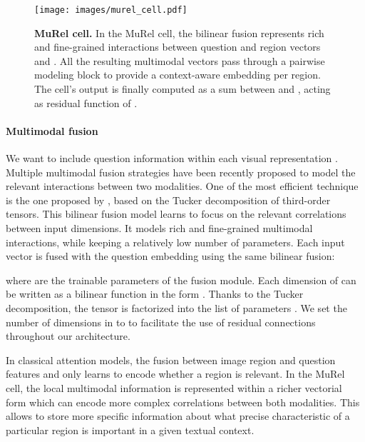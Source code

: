 \documentclass[10pt,twocolumn,letterpaper]{article}
\begin{document}
\begin{figure}
    \centering
    \texttt{[image: images/murel\_cell.pdf]}
    \caption{\label{fig:murel_cell} \textbf{MuRel cell.}
    In the MuRel cell, the bilinear fusion represents rich and fine-grained interactions between question and region vectors  and . All the resulting multimodal vectors  pass through a pairwise modeling block to provide a context-aware embedding  per region. 
    The cell's output  is finally computed as a sum between  and , acting as residual function of .}
\end{figure}

\paragraph{Multimodal fusion}
We want to include question information within each visual representation . 
Multiple multimodal fusion strategies have been recently proposed \cite{Kim2017, FukuiPYRDR16, benyounescadene2017mutan, yu2017mfb, yu2018beyond} to model the relevant interactions between two modalities. One of the most efficient technique is the one proposed by \cite{benyounescadene2017mutan}, based on the Tucker decomposition of third-order tensors. 
This bilinear fusion model learns to focus on the relevant correlations between input dimensions. It models rich and fine-grained multimodal interactions, while keeping a relatively low number of parameters. 
Each input vector  is fused with the question embedding  using the same bilinear fusion:

where  are the trainable parameters of the fusion module. Each dimension  of  can be written as a bilinear function in the form . Thanks to the Tucker decomposition, the tensor  is factorized into the list of parameters . We set the number of dimensions in  to  to facilitate the use of residual connections throughout our architecture.

In classical attention models, the fusion between image region and question features  and  only learns to encode whether a region is relevant. 
In the MuRel cell, the local multimodal information is represented within a richer vectorial form  which can encode more complex correlations between both modalities. This allows to store more specific information about what precise characteristic of a particular region is important in a given textual context.
\end{document}
